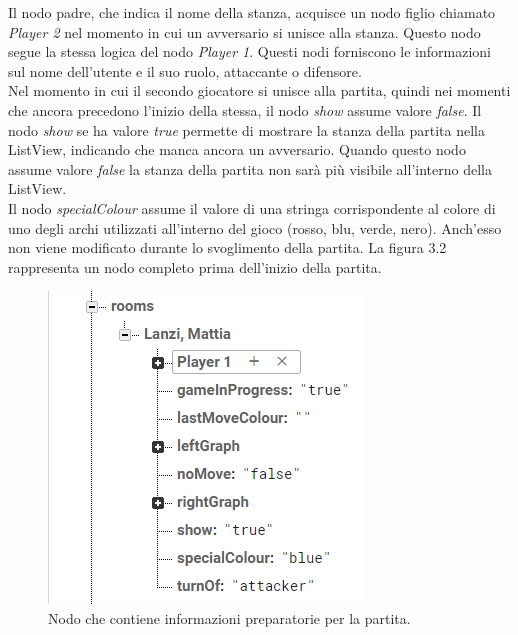\documentclass[a4paper,11pt,twoside,openright]{report}
\begin{document}
Il nodo padre, che indica il nome della stanza, acquisce un nodo figlio chiamato \textit{Player 2} nel momento in cui un avversario si unisce alla stanza. Questo nodo segue la stessa logica del nodo \textit{Player 1}. Questi nodi forniscono le informazioni sul nome dell'utente e il suo ruolo, attaccante o difensore.\\
Nel momento in cui il secondo giocatore si unisce alla partita, quindi nei momenti che ancora precedono l'inizio della stessa, il nodo \textit{show} assume valore \textit{false}.
Il nodo \textit{show} se ha valore \textit{true} permette di mostrare la stanza della partita nella ListView, indicando che manca ancora un avversario. Quando questo nodo assume valore \textit{false} la stanza della partita non sarà più visibile all'interno della ListView.\\
Il nodo \textit{specialColour} assume il valore di una stringa corrispondente al colore di uno degli archi utilizzati all'interno del gioco (rosso, blu, verde, nero). Anch'esso non viene modificato durante lo svoglimento della partita. La figura 3.2 rappresenta un nodo completo prima dell'inizio della partita.\\
\begin{figure}[h]
\includegraphics{images/Match pre node.png}
\caption{Nodo che contiene informazioni preparatorie per la partita.}
\end{figure}
\end{document}
